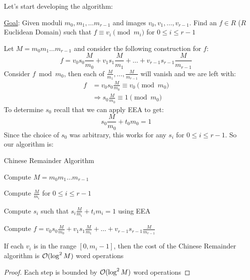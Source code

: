 Let's start developing the algorithm:

\ul{Goal}: Given moduli $m_0, m_1, \ldots m_{r - 1}$ and images $v_0, v_1, \ldots, v_{r - 1}$.
Find an $f \in R$ ($R$ Euclidean Domain) such that $f \equiv v_i \pmod{m_i}$ for $0 \leq i \leq r - 1$

Let $M = m_0m_1\ldots m_{r-1}$ and consider the following construction for $f$:
\begin{equation}
    f = v_0s_0\frac{M}{m_0} + v_1s_1\frac{M}{m_1} + \ldots + v_{r-1}s_{r-1}\frac{M}{m_{r-1}}
\end{equation}
Consider $f \bmod m_0$, then each of $\frac{M}{m_1}, \ldots, \frac{M}{m_{r-1}}$ will vanish and we are left with:
\begin{align*}
    f &= v_0s_0\frac{M}{m_0} \equiv v_0 \pmod{m_0} \\
    &\Rightarrow s_0\frac{M}{m_0} \equiv 1 \pmod{m_0}
\end{align*}
To determine $s_0$ recall that we can apply EEA to get:
\begin{equation*}
    s_0\frac{M}{m_0} + t_0m_0 = 1
\end{equation*}
Since the choice of $s_0$ was arbitrary, this works for any $s_i$ for $0 \leq i \leq r - 1$.
So our algorithm is:

\begin{algorithm}[H]
    \caption{Chinese Remainder Algorithm}\label{chinese-remainder-algorithm}

    \nl Compute $M = m_0m_1\ldots m_{r-1}$

    \nl Compute $\frac{M}{m_i}$ for $0 \leq i \leq r - 1$

    \nl Compute $s_i$ such that $s_i\frac{M}{m_i} + t_im_i = 1$ using EEA

    \nl Compute $f = v_0s_0\frac{M}{m_0} + v_1s_1\frac{M}{m_1} + \ldots + v_{r-1}s_{r-1}\frac{M}{m_{r-1}}$
\end{algorithm}

\begin{theorem}{}{}
    If each $v_i$ is in the range $[0, m_i - 1]$, then the cost of the Chinese Remainder algorithm is $\operatorname{\mathcal{O}}(\log^2 M)$ word operations
\end{theorem}
\begin{proof}
    Each step is bounded by $\operatorname{\mathcal{O}}(\log^2 M)$ word operations
\end{proof}


